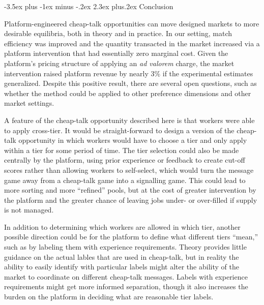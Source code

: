 \documentclass[12pt]{article}
\makeatletter
\renewcommand{\section}{%
  \@startsection{section}{1}{\z@}%
  {-3.5ex plus -1ex minus -.2ex}%
  {2.3ex plus.2ex}%
  {\normalfont\Large\bfseries}%
}
\makeatother
\begin{document}
\section{Conclusion} \label{sec:conclusion}


Platform-engineered cheap-talk opportunities can move designed markets to more desirable equilibria, both in theory and in practice.
In our setting, match efficiency was improved and the quantity transacted in the market increased via a platform intervention that had essentially zero marginal cost.
Given the platform's pricing structure of applying an \emph{ad valorem} charge, the market intervention raised platform revenue by nearly 3\% if the experimental estimates generalized. 
Despite this positive result, there are several open questions, such as whether the method could be applied to other preference dimensions and other market settings.

A feature of the cheap-talk opportunity described here is that workers were able to apply cross-tier. 
It would be straight-forward to design a version of the cheap-talk opportunity in which workers would have to choose a tier and only apply within a tier for some period of time.
The tier selection could also be made centrally by the platform, using prior experience or feedback to create cut-off scores rather than allowing workers to self-select, which would turn the message game away from a cheap-talk game into a signalling game. 
This could lead to more sorting and more ``refined'' pools, but at the cost of greater intervention by the platform and the greater chance of leaving jobs under- or over-filled if supply is not managed.

In addition to determining which workers are allowed in which tier, another possible direction could be for the platform to define what different tiers ``mean,'' such as by labeling them with experience requirements. Theory provides little guidance on the actual lables that are used in cheap-talk, but in reality the ability to easily identify with particular labels might alter the ability of the market to coordinate on different cheap-talk messages. Labels with experience requirements might get more informed separation, though it also increases the burden on the platform in deciding what are reasonable tier labels. 
\end{document}
